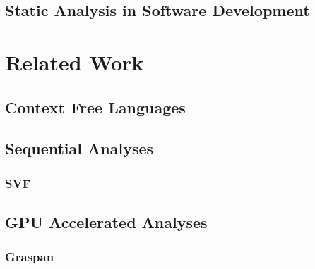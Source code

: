 \subsection{Static Analysis in Software Development}
\section{Related Work}
\subsection{Context Free Languages}
\subsection{Sequential Analyses}
\subsubsection{SVF}
\subsection{GPU Accelerated Analyses}
\subsubsection{Graspan}
